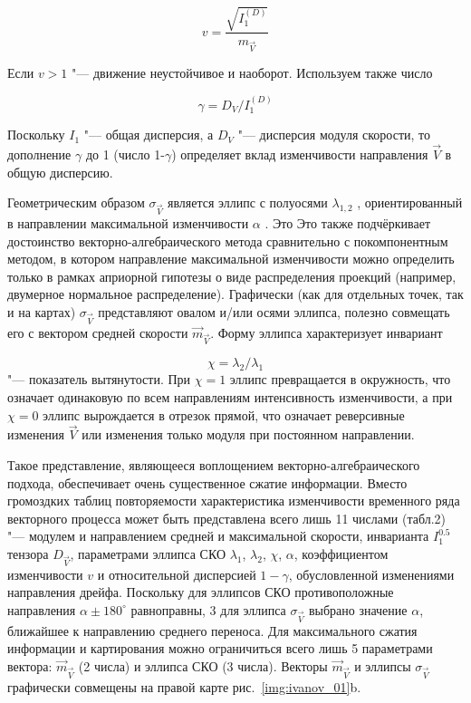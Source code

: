 \begin{equation}
\label{eq:equation3_11}
v=\frac{\sqrt{I^{(D)}_1}}{m_{\vec{V}}}
\end{equation} 

Если $v>1$ "--- движение неустойчивое и наоборот. Используем также число
		
\begin{equation}
\label{eq:equation3_12}
\gamma={D_{V}}/{I^{(D)}_1}
\end{equation} 
		
Поскольку $I_1$ "--- общая дисперсия, а $D_V$ "--- дисперсия модуля скорости, то дополнение $\gamma$ до 1 (число 1-$\gamma$) определяет вклад изменчивости направления $\vec{V}$ в общую дисперсию.

Геометрическим образом $\sigma_{\vec{V}}$ является эллипс с полуосями $\lambda_{1,2}$ , ориентированный в направлении максимальной изменчивости $\alpha$ . Это Это также подчёркивает достоинство векторно-алгебраического метода сравнительно с покомпонентным методом, в котором направление максимальной изменчивости можно определить только в рамках априорной гипотезы о виде распределения проекций (например, двумерное нормальное распределение). Графически (как для отдельных точек, так и на картах) $\sigma_{\vec{V}}$ представляют овалом и/или осями эллипса, полезно совмещать его с вектором средней скорости $\vec{m}_{\vec{V}}$. Форму эллипса характеризует инвариант
	
\begin{equation}
\label{eq:equation3_13}
\chi=\lambda_{2}/\lambda_{1}
\end{equation} "--- показатель вытянутости. При $\chi=1$ эллипс превращается в окружность, что означает одинаковую по всем направлениям интенсивность изменчивости, а при $\chi=0$ эллипс вырождается в отрезок прямой, что означает реверсивные изменения $\vec{V}$ или изменения только модуля при постоянном направлении.

Такое представление, являющееся воплощением векторно-алгебраического подхода, обеспечивает очень существенное сжатие информации. Вместо громоздких таблиц повторяемости характеристика изменчивости временного ряда векторного процесса может быть представлена всего лишь 11 числами (табл.2) "--- модулем и направлением средней и максимальной скорости, инварианта $I^{0.5}_1$ тензора $D_{\vec{V}}$, параметрами эллипса СКО $\lambda_1$, $\lambda_2$, $\chi$, $\alpha$, коэффициентом изменчивости $v$ и относительной дисперсией $1-\gamma$, обусловленной изменениями направления дрейфа. Поскольку для эллипсов СКО противоположные направления $\alpha\pm180^{\circ}$ равноправны, 3 для эллипса $\sigma_{\vec{V}}$ выбрано значение $\alpha$, ближайшее к направлению среднего переноса. Для максимального сжатия информации и картирования можно ограничиться всего лишь 5 параметрами вектора: $\vec{m}_{\vec{V}}$ (2 числа) и эллипса СКО (3 числа). Векторы $\vec{m}_{\vec{V}}$ и эллипсы $\sigma_{\vec{V}}$ графически совмещены на правой карте рис.~\ref{img:ivanov_01}b.
 
